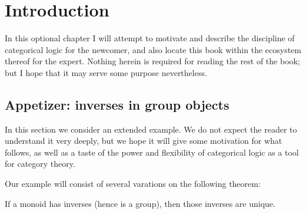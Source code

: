 \chapter{Introduction}
\label{chap:intro}


In this optional chapter I will attempt to motivate and describe the discipline of categorical logic for the newcomer, and also locate this book within the ecosystem thereof for the expert.
Nothing herein is required for reading the rest of the book; but I hope that it may serve some purpose nevertheless.


\section{Appetizer: inverses in group objects}
\label{sec:intro}

In this section we consider an extended example.
We do not expect the reader to understand it very deeply, but we hope it will give some motivation for what follows, as well as a taste of the power and flexibility of categorical logic as a tool for category theory.

Our example will consist of several varations on the following theorem:

\begin{thm}
  If a monoid has inverses (hence is a group), then those inverses are unique.
\end{thm}

